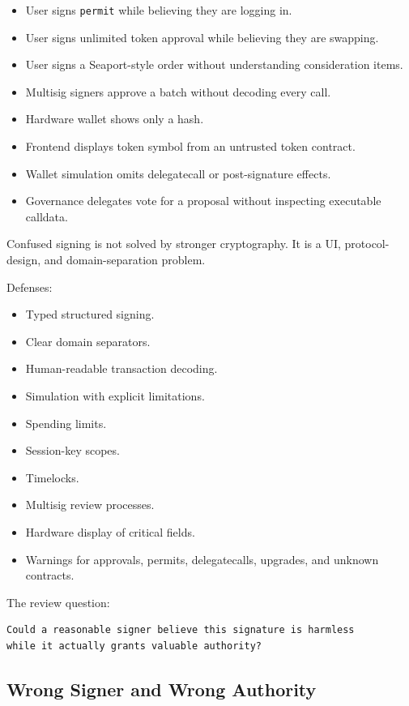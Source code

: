\begin{itemize}
\tightlist
\item
  User signs \passthrough{\lstinline!permit!} while believing they are
  logging in.
\item
  User signs unlimited token approval while believing they are swapping.
\item
  User signs a Seaport-style order without understanding consideration
  items.
\item
  Multisig signers approve a batch without decoding every call.
\item
  Hardware wallet shows only a hash.
\item
  Frontend displays token symbol from an untrusted token contract.
\item
  Wallet simulation omits delegatecall or post-signature effects.
\item
  Governance delegates vote for a proposal without inspecting executable
  calldata.
\end{itemize}

Confused signing is not solved by stronger cryptography. It is a UI,
protocol-design, and domain-separation problem.

Defenses:

\begin{itemize}
\tightlist
\item
  Typed structured signing.
\item
  Clear domain separators.
\item
  Human-readable transaction decoding.
\item
  Simulation with explicit limitations.
\item
  Spending limits.
\item
  Session-key scopes.
\item
  Timelocks.
\item
  Multisig review processes.
\item
  Hardware display of critical fields.
\item
  Warnings for approvals, permits, delegatecalls, upgrades, and unknown
  contracts.
\end{itemize}

The review question:

\begin{lstlisting}
Could a reasonable signer believe this signature is harmless
while it actually grants valuable authority?
\end{lstlisting}

\subsection{Wrong Signer and Wrong Authority}

